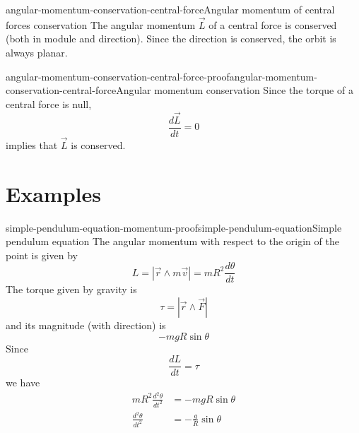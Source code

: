 \documentclass[preview]{standalone}
\begin{document}
\begin{snippetcorollary}{angular-momentum-conservation-central-force}{Angular momentum of central forces conservation}
    The angular momentum \(\vec{L}\) of a central force is conserved (both in module and direction).
    Since the direction is conserved, the orbit is always planar.
\end{snippetcorollary}

\begin{snippetproof}{angular-momentum-conservation-central-force-proof}{angular-momentum-conservation-central-force}{Angular momentum conservation}
    Since the torque of a central force is null,
    \[
        \frac{d\vec{L}}{dt} = 0
    \]
    implies that \(\vec{L}\) is conserved.
\end{snippetproof}

\section{Examples}


\begin{snippetproof}{simple-pendulum-equation-momentum-proof}{simple-pendulum-equation}{Simple pendulum equation}
    The angular momentum with respect to the origin of the point is given by
    \[
        L = |\vec{r} \wedge m\vec{v}| = mR^2 \frac{d\theta}{dt}
    \]
    The torque given by gravity is
    \[
        \tau = |\vec{r} \wedge \vec{F}|
    \]
    and its magnitude (with direction) is
    \[
        -mgR\sin\theta
    \]
    Since
    \[
        \frac{dL}{dt} = \tau
    \]
    we have
    \begin{align*}
        mR^2 \frac{d^2\theta}{dt^2} &= -mgR\sin\theta \\
        \frac{d^2\theta}{dt^2} &= -\frac{g}{R} \sin\theta
    \end{align*}
\end{snippetproof}
\end{document}
